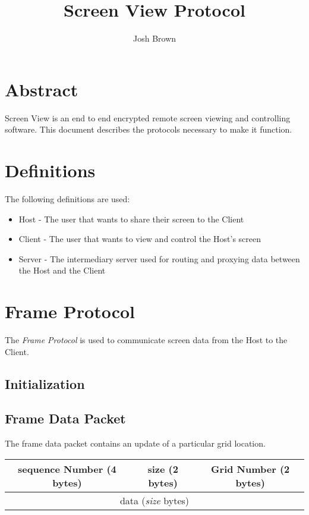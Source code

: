 \documentclass[11pt o]{article}
\title{Screen View Protocol}
\author{Josh Brown}
\newcommand{\projectName}{Screen View}
\begin{document}
    \maketitle
    \newpage
    \tableofcontents
    \newpage


    \section{Abstract}
    \projectName{} is an end to end encrypted remote screen viewing and controlling software. This document describes
    the protocols necessary to make it function.

    \newpage


    \section{Definitions}
    The following definitions are used:

    \begin{itemize}
        \item Host - The user that wants to share their screen to the Client
        \item Client - The user that wants to view and control the Host's screen
        \item Server - The intermediary server used for routing and proxying data between
        the Host and the Client
    \end{itemize}


    \section{Frame Protocol}
    The \emph{Frame Protocol} is used to communicate screen data from the Host to the Client.

    \subsection{Initialization}

    \subsection{Frame Data Packet}
    The frame data packet contains an update of a particular grid location.
    \begin{center}
        \begin{tabular}{|c|c|c|}
            \hline
            sequence Number (4 bytes) & size (2 bytes) & Grid Number (2 bytes) \\
            \hline
            \multicolumn{3}{|c|}{data (\emph{size} bytes)} \\
            \hline
        \end{tabular}
    \end{center}
\end{document}
